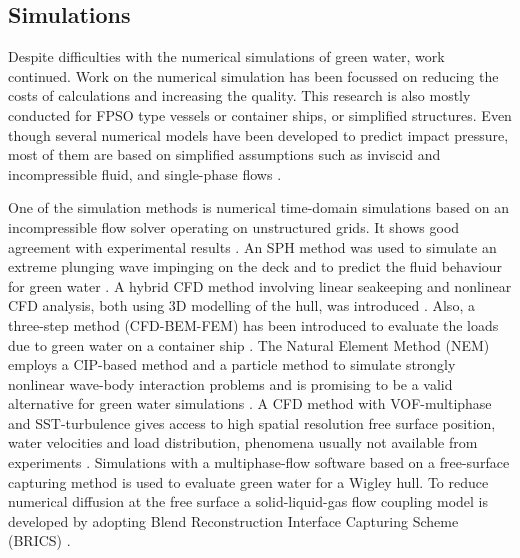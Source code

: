 \subsection{Simulations}
\label{sec:lit_sim_green_water}
Despite difficulties with the numerical simulations of green water, work continued. Work on the numerical simulation has been focussed on reducing the costs of calculations and increasing the quality. This research is also mostly conducted for FPSO type vessels or container ships, or simplified structures. 
Even though several numerical models have been developed to predict impact pressure, most of them are based on simplified assumptions such as inviscid and incompressible fluid, and single-phase flows \cite{Ariyarathne2012}. 
\par 
One of the simulation methods is numerical time-domain simulations based on an incompressible flow solver operating on unstructured grids. It shows good agreement with experimental results \cite{Lu2012}. An SPH method was used to simulate an extreme plunging wave impinging on the deck \cite{Soares2015} and to predict the fluid behaviour for green water \cite{LeTouze2010}. A hybrid CFD method involving linear seakeeping and nonlinear CFD analysis, both using 3D modelling of the hull, was introduced \cite{Kim2013}. Also, a three-step method (CFD-BEM-FEM) has been introduced to evaluate the loads due to green water on a container ship \cite{Kudupudi2019}. The Natural Element Method (NEM) employs a CIP-based method and a particle method to simulate strongly nonlinear wave-body interaction problems and is promising to be a valid alternative for green water simulations \cite{Hu2010}.
A CFD method with VOF-multiphase and SST-turbulence gives access to
high spatial resolution free surface position, water velocities and load distribution, phenomena usually not available from experiments \cite{Mandate2018}. Simulations with a multiphase-flow software based on a free-surface capturing method is used to evaluate green water for a Wigley hull. To reduce numerical diffusion at the free surface a solid-liquid-gas flow coupling model is developed by adopting Blend Reconstruction Interface Capturing Scheme (BRICS) \cite{He2017}.
\par 
